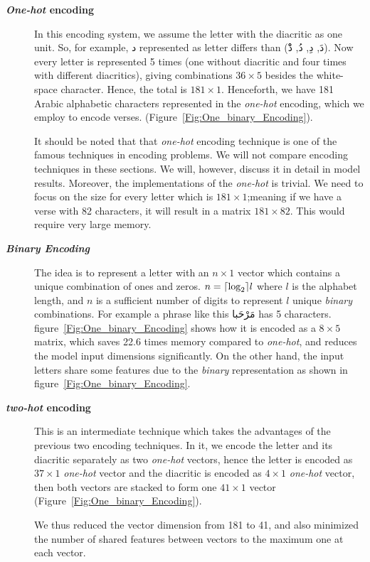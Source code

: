\begin{description}

 \item[\textbf{\textit{One-hot} encoding}] In this encoding system, we assume the letter with the diacritic as one unit. So, for example, \textarabic{د} represented as letter differs than (\textarabic{دَ, دِ, دُ, دْْ}). Now every letter is represented 5 times (one without diacritic and four times with different diacritics), giving combinations $36 \times 5$ besides the white-space character. Hence, the total is $181 \times 1$. Henceforth, we have 181 Arabic alphabetic characters represented in the \textit{one-hot} encoding, which we employ to encode verses. (Figure~\ref{Fig:One_binary_Encoding}).

 It should be noted that that \textit{one-hot} encoding technique is one of the famous techniques in
 encoding problems. We will not compare encoding techniques in these sections. We will, 
 however, discuss it in detail in model results. Moreover, the implementations of the \textit{one-hot} is
 trivial. We need to focus on the size for every letter which is $181 \times 1$;meaning if we have
 a verse with 82 characters, it will result in a matrix $181 \times 82$. This would require very 
 large memory.

 \item[\textbf{\textit{Binary Encoding}}] The idea is to represent a letter with an $n \times 1$ vector which contains a unique combination of ones and zeros. $n =\ceil*{\log_2} l$ where $l$ is the alphabet length, and $n$ is a sufficient number of digits to represent $l$ unique \textit{binary} combinations. For example a phrase like this \textarabic{مَرْحَبا} has 5 characters. figure~\ref{Fig:One_binary_Encoding} shows how it is encoded as a $8 \times 5$ matrix, which saves 22.6 times memory compared to \textit{one-hot}, and reduces the model input dimensions significantly. On the other hand, the input letters share some features due to the \textit{binary} representation as shown in figure~\ref{Fig:One_binary_Encoding}.

 \item[\textbf{\textit{two-hot} encoding}] This is an intermediate technique which takes the advantages of the previous two encoding techniques. In it, we encode the letter and its diacritic separately as two \textit{one-hot} vectors, hence the letter is encoded as $37 \times 1$ \textit{one-hot} vector and the diacritic is encoded as $4 \times 1$ \textit{one-hot} vector, then both vectors are stacked to form one $41 \times 1$ vector (Figure~\ref{Fig:One_binary_Encoding}).

 We thus reduced the vector dimension from 181 to 41, and also minimized the number of shared features between vectors to the maximum one at each vector. 

\end{description}


